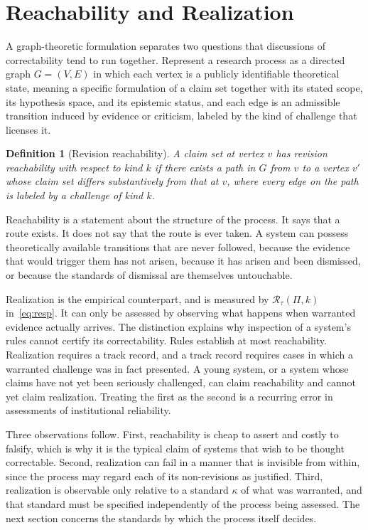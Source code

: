 \documentclass[11pt]{article}
\newtheorem{definition}{Definition}
\theoremstyle{remark}
\begin{document}
\section{Reachability and Realization}
\label{sec:reach}

A graph-theoretic formulation separates two questions that discussions of correctability tend to run together. Represent a research process as a directed graph $G=(V,E)$ in which each vertex is a publicly identifiable theoretical state, meaning a specific formulation of a claim set together with its stated scope, its hypothesis space, and its epistemic status, and each edge is an admissible transition induced by evidence or criticism, labeled by the kind of challenge that licenses it.

\begin{definition}[Revision reachability]
A claim set at vertex $v$ has revision reachability with respect to kind $k$ if there exists a path in $G$ from $v$ to a vertex $v'$ whose claim set differs substantively from that at $v$, where every edge on the path is labeled by a challenge of kind $k$.
\end{definition}

Reachability is a statement about the structure of the process. It says that a route exists. It does not say that the route is ever taken. A system can possess theoretically available transitions that are never followed, because the evidence that would trigger them has not arisen, because it has arisen and been dismissed, or because the standards of dismissal are themselves untouchable.

Realization is the empirical counterpart, and is measured by $\mathcal R_\tau(\Pi,k)$ in~\eqref{eq:resp}. It can only be assessed by observing what happens when warranted evidence actually arrives. The distinction explains why inspection of a system's rules cannot certify its correctability. Rules establish at most reachability. Realization requires a track record, and a track record requires cases in which a warranted challenge was in fact presented. A young system, or a system whose claims have not yet been seriously challenged, can claim reachability and cannot yet claim realization. Treating the first as the second is a recurring error in assessments of institutional reliability.

Three observations follow. First, reachability is cheap to assert and costly to falsify, which is why it is the typical claim of systems that wish to be thought correctable. Second, realization can fail in a manner that is invisible from within, since the process may regard each of its non-revisions as justified. Third, realization is observable only relative to a standard $\kappa$ of what was warranted, and that standard must be specified independently of the process being assessed. The next section concerns the standards by which the process itself decides.
\end{document}

